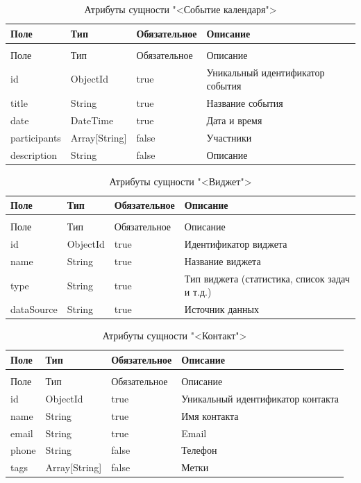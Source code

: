 \begin{xltabular}{\textwidth}{|l|l|p{3.2cm}|X|}
  \caption{Атрибуты сущности "<Событие календаря">\label{calendar:table}}\\ \hline
  Поле & Тип & Обязательное & Описание \\ \hline
  \endfirsthead
  \\ \hline
  Поле & Тип & Обязательное & Описание \\ \hline
  \endhead
  id & ObjectId & true & Уникальный идентификатор события \\ \hline
  title & String & true & Название события \\ \hline
  date & DateTime & true & Дата и время \\ \hline
  participants & Array[String] & false & Участники \\ \hline
  description & String & false & Описание \\ \hline
\end{xltabular}

\begin{xltabular}{\textwidth}{|l|l|p{3.2cm}|X|}
  \caption{Атрибуты сущности "<Виджет">\label{dashboard:table}}\\ \hline
  Поле & Тип & Обязательное & Описание \\ \hline
  \endfirsthead
  \\ \hline
  Поле & Тип & Обязательное & Описание \\ \hline
  \endhead
  id & ObjectId & true & Идентификатор виджета \\ \hline
  name & String & true & Название виджета \\ \hline
  type & String & true & Тип виджета (статистика, список задач и т.д.) \\ \hline
  dataSource & String & true & Источник данных \\ \hline
\end{xltabular}

\begin{xltabular}{\textwidth}{|l|l|p{3.2cm}|X|}
  \caption{Атрибуты сущности "<Контакт">\label{contacts:table}}\\ \hline
  Поле & Тип & Обязательное & Описание \\ \hline
  \endfirsthead
  \\ \hline
  Поле & Тип & Обязательное & Описание \\ \hline
  \endhead
  id & ObjectId & true & Уникальный идентификатор контакта \\ \hline
  name & String & true & Имя контакта \\ \hline
  email & String & true & Email \\ \hline
  phone & String & false & Телефон \\ \hline
  tags & Array[String] & false & Метки \\ \hline
\end{xltabular}

